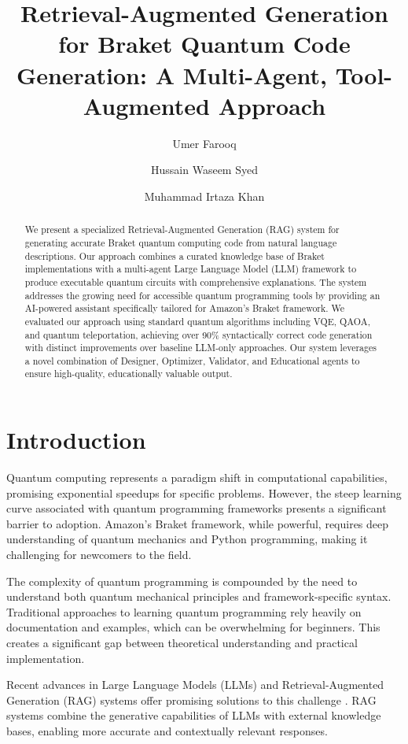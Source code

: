 \documentclass[runningheads]{llncs}
\title{Retrieval-Augmented Generation for Braket Quantum Code Generation: A Multi-Agent, Tool-Augmented Approach}
\author{Umer Farooq \and Hussain Waseem Syed \and Muhammad Irtaza Khan}
\institute{FAST NUCES Islamabad, Department of Computer Science\\
\email{i220891@nu.edu.pk, i220893@nu.edu.pk, i220911@nu.edu.pk}}
\begin{document}
\maketitle

\begin{abstract}
We present a specialized Retrieval-Augmented Generation (RAG) system for generating accurate Braket quantum computing code from natural language descriptions. Our approach combines a curated knowledge base of Braket implementations with a multi-agent Large Language Model (LLM) framework to produce executable quantum circuits with comprehensive explanations. The system addresses the growing need for accessible quantum programming tools by providing an AI-powered assistant specifically tailored for Amazon's Braket framework. We evaluated our approach using standard quantum algorithms including VQE, QAOA, and quantum teleportation, achieving over 90\% syntactically correct code generation with distinct improvements over baseline LLM-only approaches. Our system leverages a novel combination of Designer, Optimizer, Validator, and Educational agents to ensure high-quality, educationally valuable output.
\end{abstract}

\section{Introduction}

Quantum computing represents a paradigm shift in computational capabilities, promising exponential speedups for specific problems. However, the steep learning curve associated with quantum programming frameworks presents a significant barrier to adoption. Amazon's Braket framework, while powerful, requires deep understanding of quantum mechanics and Python programming, making it challenging for newcomers to the field.

The complexity of quantum programming is compounded by the need to understand both quantum mechanical principles and framework-specific syntax. Traditional approaches to learning quantum programming rely heavily on documentation and examples, which can be overwhelming for beginners. This creates a significant gap between theoretical understanding and practical implementation.

Recent advances in Large Language Models (LLMs) and Retrieval-Augmented Generation (RAG) systems offer promising solutions to this challenge \cite{siavash2025modeldrivenquantumcodegeneration}. RAG systems combine the generative capabilities of LLMs with external knowledge bases, enabling more accurate and contextually relevant responses. 
\end{document}
